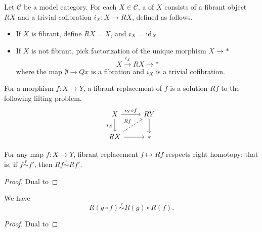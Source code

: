 \documentclass[main.tex]{subfiles}
\begin{document}
\begin{definition}
  \label{def:fibrant_replacement}
  Let $\mathcal{C}$ be a model category. For each $X \in \mathcal{C}$, a  of $X$ consists of a fibrant object $RX$ and a trivial cofibration $i_{X}\colon X \to RX$, defined as follows.
  \begin{itemize}
    \item If $X$ is fibrant, define $RX = X$, and $i_{X} = \mathrm{id}_{X}$.

    \item If $X$ is not fibrant, pick factorization of the unique morphism $X \to *$
      \begin{equation*}
        X \overset{i_{X}}{\to} RX \to *
      \end{equation*}
      where the map $\emptyset \to Qx$ is a fibration and $i_{X}$ is a trivial cofibration.
  \end{itemize}

  For a morphism $f\colon X \to Y$, a fibrant replacement of $f$ is a solution $Rf$ to the following lifting problem.
  \begin{equation*}
    \begin{tikzcd}
      X
      \arrow[r, "i_{Y} \circ f"]
      \arrow[d, swap, "i_{X}"]
      & RY
      \arrow[d]
      \\
      RX
      \arrow[r]
      \arrow[ur, dashed, "Rf"]
      & *
    \end{tikzcd}
  \end{equation*}
\end{definition}

\begin{lemma}
  \label{lemma:fibrant_replacement_respects_right_homotopy}
  For any map $f\colon X \to Y$, fibrant replacement $f \mapsto Rf$ respects right homotopy; that is, if $f \overset{r}{\sim} f'$, then $Rf \overset{r}{\sim} Rf'$.
\end{lemma}
\begin{proof}
  Dual to
\end{proof}

\begin{corollary}
  We have
  \begin{equation*}
    R(g \circ f) \overset{r}{\sim} R(g) \circ R(f).
  \end{equation*}
\end{corollary}
\begin{proof}
  Dual to
\end{proof}
\end{document}
